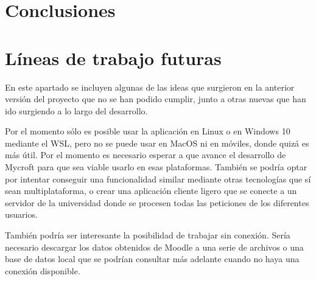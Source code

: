 
\section{Conclusiones}


\section{Líneas de trabajo futuras}
En este apartado se incluyen algunas de las ideas que surgieron en la anterior versión del proyecto que no se han podido cumplir, junto a otras  nuevas que han ido surgiendo a lo largo del desarrollo.

Por el momento sólo es posible usar la aplicación en Linux o en Windows 10 mediante el WSL, pero no se puede usar en MacOS ni en móviles, donde quizá es más útil. Por el momento es necesario esperar a que avance el desarrollo de Mycroft para que sea viable usarlo en esas plataformas. También se podría optar por intentar conseguir una funcionalidad similar mediante otras tecnologías que sí sean multiplataforma, o crear una aplicación cliente ligero que se conecte a un servidor de la universidad donde se procesen todas las peticiones de los diferentes usuarios.

También podría ser interesante la posibilidad de trabajar sin conexión. Sería necesario descargar los datos obtenidos de Moodle a una serie de archivos o una base de datos local que se podrían consultar más adelante cuando no haya una conexión disponible.